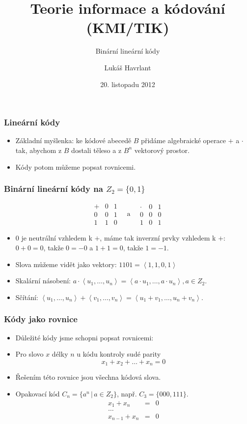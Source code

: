 \documentclass{beamer}
\title{Teorie informace a kódování (KMI/TIK)}
\subtitle{Binární lineární kódy}
\author{Lukáš Havrlant}
\date{20. listopadu 2012}
\institute{Univerzita Palackého}
\newcommand{\sep}{\,|\,}
\newenvironment{itemizex}%
  {\large \begin{itemize}%
    \setlength{\itemsep}{8pt}%
    \setlength{\parskip}{8pt}}%
  {\end{itemize}}
\begin{document}
\begin{frame}[t,plain]
\titlepage
\end{frame}



\begin{frame}[t,fragile]\frametitle{Lineární kódy} 
    \begin{itemizex}
        \item Základní myšlenka: ke kódové abecedě $B$ přidáme algebraické operace $+$ a $\cdot$ tak, abychom z $B$ dostali těleso a z $B^n$ vektorový prostor.
        \item Kódy potom můžeme popsat rovnicemi. 
    \end{itemizex}
\end{frame}


\begin{frame}[t,fragile]\frametitle{Binární lineární kódy na $Z_2=\{0,1\}$}
$$
\begin{array}{c|cc}
+&0&1\\\hline
0&0&1\\
1&1&0
\end{array}
\quad\mbox{a}\quad
\begin{array}{c|cc}
\cdot&0&1\\\hline
0&0&0\\
1&0&1
\end{array}
$$

\begin{itemizex}
    \item 0 je neutrální vzhledem k $+$, máme tak inverzní prvky vzhledem k $+$: $0+0=0$, takže $0=-0$ a $1+1=0$, takže $1=-1$.
    \item Slova můžeme vidět jako vektory: $1101 = \left<1,1,0,1\right>$
    \item Skalární násobení: $a\cdot\left<u_1, \dots, u_n\right> = \left<a\cdot u_1, \dots, a\cdot u_n\right>, a\in Z_2$.
    \item Sčítání: $\left<u_1, \dots, u_n\right> + \left<v_1, \dots, v_n\right> = \left<u_1+v_1, \dots, u_n+v_n\right>$.
\end{itemizex}
\end{frame}



\begin{frame}[t,fragile]\frametitle{Kódy jako rovnice} 
    \begin{itemizex}
        \item Důležité kódy jsme schopni popsat rovnicemi:
        \item Pro slovo $x$ délky $n$ u kódu kontroly sudé parity
$$
x_1+x_2+\dots+x_n=0
$$
        \item Řešením této rovnice jsou všechna kódová slova.
        \item Opakovací kód $C_n = \{a^n\sep a\in Z_2\}$, např. $C_3=\{000, 111\}$.
  \begin{eqnarray*}
  x_1+x_n&=&0\\
  \dots\\
  x_{n-1}+x_n&=&0
  \end{eqnarray*}
    \end{itemizex}
\end{frame}
\end{document}
